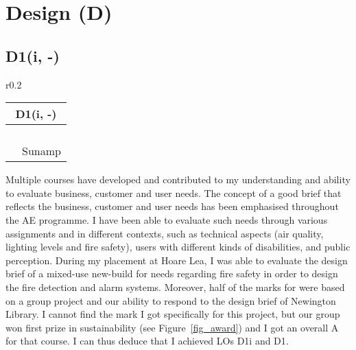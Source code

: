 
\section{Design (D)}

\subsection*{D1(i, -)}

\begin{wraptable}{r}{0.2\textwidth}
	\begin{tabular}{|ll|}
		\hline
		\multicolumn{2}{|c|}{\cellcolor[HTML]{F8A102}\textbf{D1(i, -) \master}} \\ \hline
		\ID & \IE \\
		\EnvBeh & \CAS \\
		\ELS & \PC \\
		\FMP & \PRJ \\
		\ISE & Sunamp \\ \hline
	\end{tabular}
\end{wraptable}

Multiple courses have developed and contributed to my understanding and ability to evaluate business, customer and user needs.
The concept of a good brief that reflects the business, customer and user needs has been emphasised throughout the AE programme.
I have been able to evaluate such needs through various assignments and in different contexts, such as technical aspects (air quality, lighting levels and fire safety), users with different kinds of disabilities, and public perception.
During my placement at Hoare Lea, I was able to evaluate the design brief of a mixed-use new-build for needs regarding fire safety in order to design the fire detection and alarm systems.
Moreover, half of the marks for \CASTitle \space were based on a group project and our ability to respond to the design brief of Newington Library.
I cannot find the mark I got specifically for this project, but our group won first prize in sustainability (see Figure~\ref{fig_award}) and I got an overall A for that course.
I can thus deduce that I achieved LOs D1i and D1.








